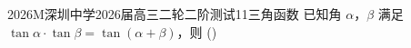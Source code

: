 
\begin{problem}{2026}{M}{深圳中学2026届高三二轮二阶测试}{11}{三角函数}
已知角 $\alpha$，$\beta$ 满足 $\tan\alpha\cdot\tan\beta=\tan(\alpha+\beta)$，则 (\hspace{1cm})
\begin{choices}
\end{choices}
\end{problem}